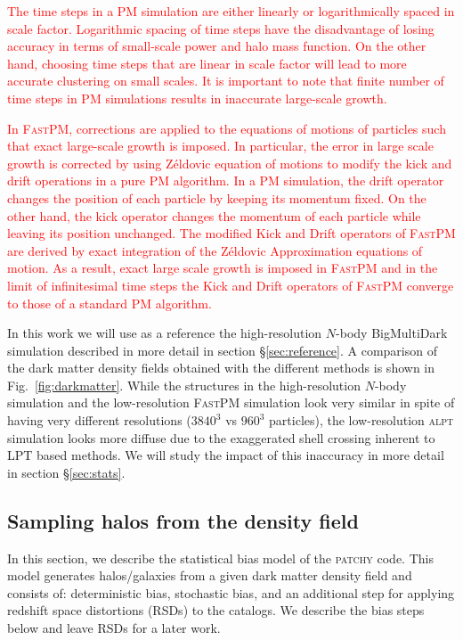 \documentclass[english,usenatbib]{mn2e}
\newcommand{\tod}[1]{{\textcolor{red}{ #1}}}
\begin{document}
\tod{The time steps in a \textsc{PM} simulation are either linearly or logarithmically spaced in scale factor. Logarithmic spacing of time steps have the disadvantage of losing accuracy in terms of small-scale power and halo mass function. On the other hand, choosing time steps that are linear in scale factor will lead to more accurate clustering on small scales. It is important to note that finite number of time steps in \textsc{PM} simulations results in inaccurate large-scale growth.}

\tod{In \textsc{FastPM}, corrections are applied to the equations of motions of particles such that exact large-scale growth is imposed. In particular, the error in large scale growth is corrected by using Z\'{e}ldovic equation of motions to modify the kick and drift operations in a pure PM algorithm. In a PM simulation, the drift operator changes the position of each particle by keeping its momentum fixed. On the other hand, the kick operator changes the momentum of each particle while leaving its position unchanged. The modified Kick and Drift operators of \textsc{FastPM} are derived by exact integration of the Z\'{e}ldovic Approximation equations of motion. As a result, exact large scale growth is imposed in \textsc{FastPM} and in the limit of infinitesimal time steps the Kick and Drift operators of \textsc{FastPM} converge to those of a standard \textsc{PM} algorithm.}

In this work we will use as a reference the high-resolution $N$-body BigMultiDark simulation described in more detail in section \S \ref{sec:reference}.
A comparison of the dark matter density fields obtained with the different methods is shown in Fig.~\ref{fig:darkmatter}. While the structures in the high-resolution $N$-body simulation and the low-resolution \textsc{FastPM} simulation look very similar in spite of having very different resolutions ($3840^3$ vs $960^3$ particles), the low-resolution \textsc{alpt} simulation looks more diffuse due to the exaggerated shell crossing inherent to LPT based methods. We will study the impact of this inaccuracy in more detail in section \S \ref{sec:stats}. 

\subsection{Sampling halos from the density field}
\label{sec:bias}

In this section, we describe the statistical bias model of the \textsc{patchy} code.  This model generates halos/galaxies from a given dark matter density field and consists of: deterministic bias, stochastic bias, and an additional step for applying redshift space distortions (RSDs) to the catalogs. We describe the bias steps below and leave RSDs for a later work. 
\end{document}
